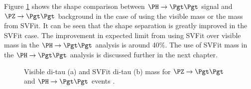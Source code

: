 Figure \ref{fig:svfit} shows the shape comparison between $\PH\to\Pgt\Pgt$ signal
and $\PZ \to \Pgt\Pgt$ background in the case of using the visible mass or the mass from SVFit. It can
be seen that the shape separation is greatly improved in the SVFit case.
The improvement in expected limit from using SVFit over visible mass in the $\PH
\to \Pgt\Pgt$ analysis is around 40$\%$. The use of SVFit mass in the
$\PH\to\Pgt\Pgt$ analysis is discussed further in the next chapter.

\begin{figure}[tbh]
\begin{center}
\end{center}
\caption[Di-tau mass for for $\ZToTauTau$ and $\HToTauTau$ events, reconstructed
using the visible products or the SVFit algorithm.]{Visible di-tau (a) and SVFit
di-tau (b) mass for $\ZToTauTau$ and $\HToTauTau$ events \cite{HIG-13-004}.
} 
\label{fig:svfit}
\end{figure}


